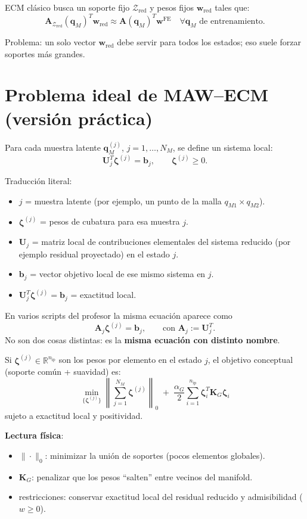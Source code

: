 \documentclass[11pt,a4paper]{article}
\newcommand{\A}{\bm A}
\newcommand{\U}{\bm U}
\newcommand{\K}{\bm K}
\begin{document}
ECM cl\'asico busca un soporte fijo $\mathcal Z_{\text{red}}$ y pesos fijos
$\bm w_{\text{red}}$ tales que:
\[
\A_{\mathcal Z_{\text{red}}}(\bm q_M)^T \bm w_{\text{red}}
\approx
\A(\bm q_M)^T\bm w^{\text{FE}}
\quad \forall \bm q_M \text{ de entrenamiento}.
\]

Problema: un solo vector $\bm w_{\text{red}}$ debe servir para todos los estados;
eso suele forzar soportes m\'as grandes.

\section{Problema ideal de MAW--ECM (versi\'on pr\'actica)}
Para cada muestra latente $\bm q_M^{(j)}$, $j=1,\dots,N_M$, se define un sistema local:
\[
\U_j^T \bm\zeta^{(j)}=\bm b_j,\qquad \bm\zeta^{(j)}\ge 0.
\]

Traducci\'on literal:
\begin{itemize}[leftmargin=0.8cm]
    \item $j$ = muestra latente (por ejemplo, un punto de la malla $q_{M1}\times q_{M2}$).
    \item $\bm\zeta^{(j)}$ = pesos de cubatura para esa muestra $j$.
    \item $\U_j$ = matriz local de contribuciones elementales del sistema reducido (por ejemplo residual proyectado) en el estado $j$.
    \item $\bm b_j$ = vector objetivo local de ese mismo sistema en $j$.
    \item $\U_j^T\bm\zeta^{(j)}=\bm b_j$ = exactitud local.
\end{itemize}

En varios scripts del profesor la misma ecuaci\'on aparece como
\[
\A_j\bm\zeta^{(j)}=\bm b_j,\qquad \text{con } \A_j:=\U_j^T.
\]
No son dos cosas distintas: es la \textbf{misma ecuaci\'on con distinto nombre}.

Si $\bm\zeta^{(j)}\in\mathbb R^{n_{\text{ip}}}$ son los pesos por elemento en el estado $j$,
el objetivo conceptual (soporte com\'un + suavidad) es:
\[
\min_{\{\bm\zeta^{(j)}\}}
\left\|\sum_{j=1}^{N_M}\bm\zeta^{(j)}\right\|_0
\;+\;
\frac{\alpha_G}{2}\sum_{i=1}^{n_{\text{ip}}}\bm\zeta_i^T\K_G\bm\zeta_i
\]
sujeto a exactitud local y positividad.

\textbf{Lectura f\'isica}:
\begin{itemize}[leftmargin=0.8cm]
    \item $\|\cdot\|_0$: minimizar la uni\'on de soportes (pocos elementos globales).
    \item $\K_G$: penalizar que los pesos ``salten'' entre vecinos del manifold.
    \item restricciones: conservar exactitud local del residual reducido y admisibilidad ($w\ge 0$).
\end{itemize}
\end{document}
